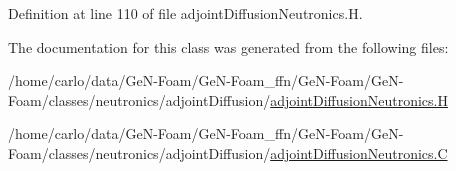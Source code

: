 Definition at line 110 of file adjoint\+Diffusion\+Neutronics.\+H.



The documentation for this class was generated from the following files\+:\begin{DoxyCompactItemize}
\item 
/home/carlo/data/\+Ge\+N-\/\+Foam/\+Ge\+N-\/\+Foam\+\_\+ffn/\+Ge\+N-\/\+Foam/\+Ge\+N-\/\+Foam/classes/neutronics/adjoint\+Diffusion/\hyperlink{adjointDiffusionNeutronics_8H}{adjoint\+Diffusion\+Neutronics.\+H}\item 
/home/carlo/data/\+Ge\+N-\/\+Foam/\+Ge\+N-\/\+Foam\+\_\+ffn/\+Ge\+N-\/\+Foam/\+Ge\+N-\/\+Foam/classes/neutronics/adjoint\+Diffusion/\hyperlink{adjointDiffusionNeutronics_8C}{adjoint\+Diffusion\+Neutronics.\+C}\end{DoxyCompactItemize}

